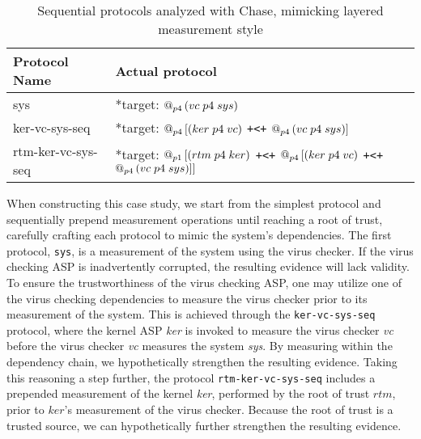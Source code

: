 \documentclass[runningheads]{llncs}
\theoremstyle{definition}
\begin{document}
\begin{table}[htbp]
    \setlength\extrarowheight{7pt}
    \centering
    \begin{tabular}{|M{4cm}|M{12cm}|N}
        \hline
        Protocol Name & Actual protocol &\\
        \hline
        sys & *target: $\mathop{@_{p4}}{(vc\; p4\; sys)}$  &\\ 
        \hline   
        ker-vc-sys-seq & *target:  $\mathop{@_{p4}}{[(ker\; p4\; vc)}$ \texttt{+<+} $\mathop{@_{p4}}{(vc\; p4\; sys)}]$ &\\ \hline 
        rtm-ker-vc-sys-seq & *target: $\mathop{@_{p1}}{[(rtm\; p4\; ker)}$ \texttt{+<+} $\mathop{@_{p4}}{[(ker\; p4\; vc)}$ \texttt{+<+} $\mathop{@_{p4}}{(vc\; p4\; sys)}]]$ &\\
        \hline
    \end{tabular}
    \caption[Chase Analysis with Varied Dependencies]{Sequential protocols analyzed with Chase, mimicking layered measurement style}
    \label{Chase-table}
\end{table}

When constructing this case study, we start from the simplest protocol and sequentially prepend measurement operations until reaching a root of trust, carefully crafting each protocol to mimic the system's dependencies. The first protocol, \texttt{sys}, is a measurement of the system using the virus checker. If the virus checking ASP is inadvertently corrupted, the resulting evidence will lack validity. To ensure the trustworthiness of the virus checking ASP, one may utilize one of the virus checking dependencies to measure the virus checker prior to its measurement of the system. This is achieved through the \texttt{ker-vc-sys-seq} protocol, where the kernel ASP \emph{ker} is invoked to measure the virus checker \emph{vc} before the virus checker \emph{vc} measures the system \emph{sys}. By measuring within the dependency chain, we hypothetically strengthen the resulting evidence. Taking this reasoning a step further, the protocol \texttt{rtm-ker-vc-sys-seq} includes a prepended measurement of the kernel \emph{ker}, performed by the root of trust $rtm$, prior to $ker$'s measurement of the virus checker. Because the root of trust is a trusted source, we can hypothetically further strengthen the resulting evidence. 
\end{document}
